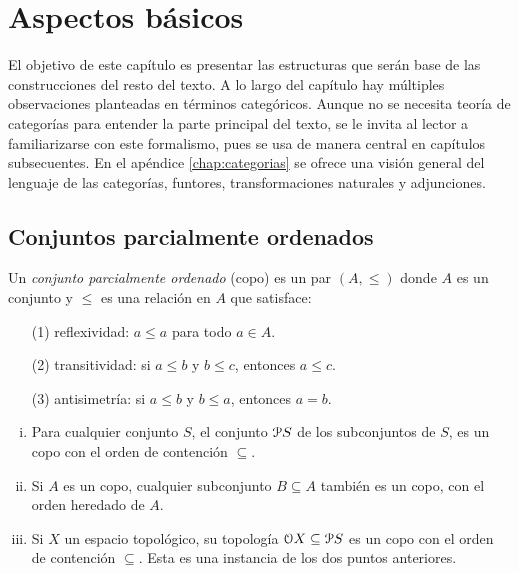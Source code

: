 \chapter{Aspectos básicos}\label{chap 1}

El objetivo de este capítulo es presentar las estructuras que serán
base de las construcciones del resto del texto. A lo largo del
capítulo hay múltiples observaciones planteadas en términos
categóricos. Aunque
no se necesita teoría de categorías para entender la parte principal
del texto, se le invita al lector a familiarizarse con este
formalismo, pues se usa de manera central en capítulos subsecuentes.
En el apéndice \ref{chap:categorias} se ofrece una visión general del
lenguaje de las categorías, funtores, transformaciones naturales y adjunciones.

\section{Conjuntos parcialmente ordenados}\label{copos}
\begin{definition}\label{copo}
  

Un \emph{ conjunto parcialmente ordenado } (copo) es un par $(A,\leq)$
donde $A$ es un conjunto y $\leq$ es una relación en $A$ que
satisface:
\begin{itemize}
  \item[(1)] reflexividad: $a\leq a$ para todo $a\in A$.
  \item[(2)]  transitividad: si $a\leq b$ y $b\leq c$, entonces $a\leq c$.
  \item[(3)] antisimetría: si $a\leq b$ y $b\leq a$, entonces $a=b$.
\end{itemize}
\end{definition}
\begin{example} \leavevmode
  \begin{enumerate}[(i)]
    \item
      Para cualquier conjunto $S$, el conjunto $\cal PS$ de los
      subconjuntos de $S$, es un copo con el orden de contención $\subseteq$.
    \item
      Si $A$ es un copo, cualquier subconjunto $B\subseteq A$ también
      es un copo, con el orden heredado de $A$.
    \item
      Si $X$ un espacio topológico, su topología $\cal OX\subseteq\cal
      PS$ es un copo con el orden de contención $\subseteq$. Esta es
      una instancia de los dos puntos anteriores.
  \end{enumerate}
\end{example}

